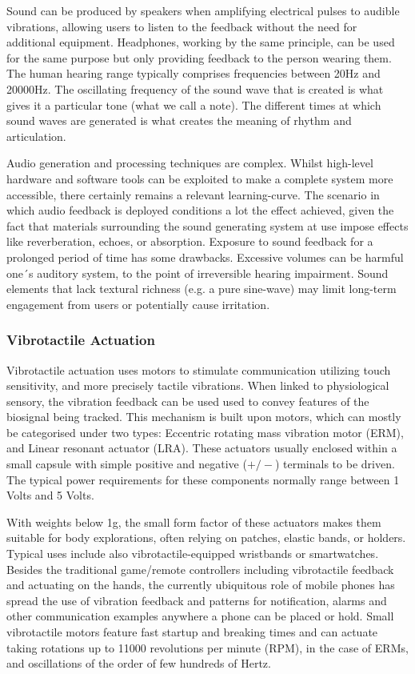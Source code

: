 Sound can be produced by speakers when amplifying electrical pulses to audible vibrations, allowing users to listen to the feedback without the need for additional equipment. Headphones, working by the same principle, can be used for the same purpose but only providing feedback to the person wearing them. The human hearing range typically comprises frequencies between 20Hz and 20000Hz. The oscillating frequency of the sound wave that is created is what gives it a particular tone (what we call a note). The different times at which sound waves are generated is what creates the meaning of rhythm and articulation.

Audio generation and processing techniques are complex. Whilst high-level hardware and software tools can be exploited to make a complete system more accessible, there certainly remains a relevant learning-curve. The scenario in which audio feedback is deployed conditions a lot the effect achieved, given the fact that materials surrounding the sound generating system at use impose effects like reverberation, echoes, or absorption. Exposure to sound feedback for a prolonged period of time has some drawbacks. Excessive volumes can be harmful one´s auditory system, to the point of irreversible hearing impairment. Sound elements that lack textural richness (e.g. a pure sine-wave) may limit long-term engagement from users or potentially cause irritation. 

\subsubsection{Vibrotactile Actuation}

Vibrotactile actuation uses motors to stimulate communication utilizing touch sensitivity, and more precisely tactile vibrations. When linked to physiological sensory, the vibration feedback can be used used to convey features of the biosignal being tracked. This mechanism is built upon motors, which can mostly be categorised under two types: Eccentric rotating mass vibration motor (ERM), and Linear resonant actuator (LRA). These actuators usually enclosed within a small capsule with simple positive and negative ($+/-$) terminals to be driven. The typical power requirements for these components normally range between 1 Volts and 5 Volts. 

With weights below 1g, the small form factor of these actuators makes them suitable for body explorations, often relying on patches, elastic bands, or holders. Typical uses include also vibrotactile-equipped wristbands or smartwatches. Besides the traditional game/remote controllers including vibrotactile feedback and actuating on the hands, the currently ubiquitous role of mobile phones has spread the use of vibration feedback and patterns for notification, alarms and other communication examples anywhere a phone can be placed or hold. Small vibrotactile motors feature fast startup and breaking times and can actuate taking rotations up to 11000 revolutions per minute (RPM), in the case of ERMs, and oscillations of the order of few hundreds of Hertz. 

